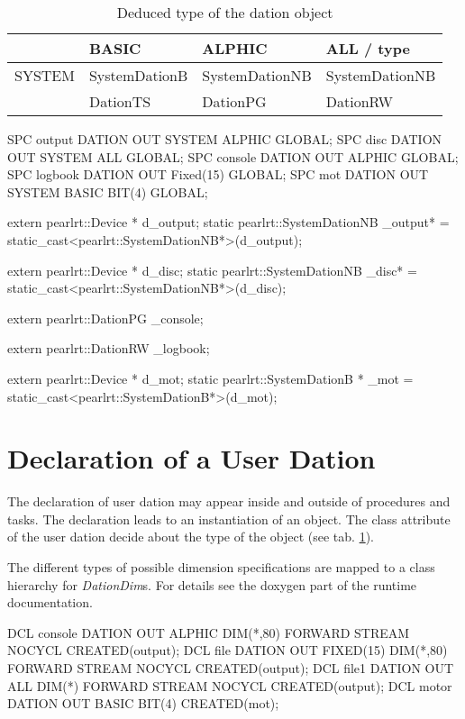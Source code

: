 \begin{table}[bpht]
\begin{tabular}{l|l|l|l}
  & BASIC & ALPHIC & ALL / type \\
\hline
SYSTEM & SystemDationB & SystemDationNB & SystemDationNB \\
 & DationTS & DationPG & DationRW \\
\hline
\end{tabular}
\caption{Deduced type of the dation object}
\label{dationTypes}
\end{table}


\begin{PEARLCode}
SPC output DATION OUT SYSTEM ALPHIC GLOBAL;
SPC disc DATION OUT SYSTEM ALL GLOBAL;
SPC console DATION OUT ALPHIC GLOBAL;
SPC logbook DATION OUT Fixed(15) GLOBAL;
SPC mot DATION OUT SYSTEM BASIC BIT(4) GLOBAL;
\end{PEARLCode}

\begin{CppCode}
extern pearlrt::Device * d_output;
static pearlrt::SystemDationNB _output* = 
             static_cast<pearlrt::SystemDationNB*>(d_output);

extern pearlrt::Device * d_disc;
static pearlrt::SystemDationNB _disc* = 
             static_cast<pearlrt::SystemDationNB*>(d_disc);

extern pearlrt::DationPG _console;

extern pearlrt::DationRW _logbook;

extern pearlrt::Device * d_mot;
static pearlrt::SystemDationB * _mot = 
             static_cast<pearlrt::SystemDationB*>(d_mot);
\end{CppCode}

\section{Declaration of a User Dation}
The declaration of user dation may appear inside and outside of procedures and 
tasks.
The declaration leads to an instantiation of an object. 
The class attribute of the user dation decide about the type of the object
(see tab. \ref{dationTypes}).

The different types of possible dimension specifications are mapped to
a class hierarchy for {\em DationDim}s. For details see the doxygen part 
of the runtime documentation.

\begin{PEARLCode}
DCL console DATION OUT ALPHIC DIM(*,80) FORWARD STREAM NOCYCL CREATED(output);
DCL file DATION OUT FIXED(15) DIM(*,80) FORWARD STREAM NOCYCL CREATED(output);
DCL file1 DATION OUT ALL DIM(*) FORWARD STREAM NOCYCL CREATED(output);
DCL motor DATION OUT BASIC BIT(4) CREATED(mot);
\end{PEARLCode}

